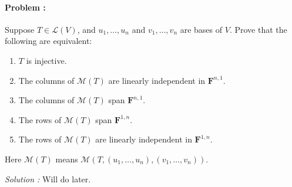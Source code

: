 \paragraph{Problem :}
Suppose \(T \in \mathcal{L}(V)\), and \(u_{1}, \dots, u_{n}\) and \(v_{1}, \dots, v_{n}\) are bases of \(V\). Prove that the following are
equivalent:
\begin{enumerate}[label=(\alph*)]
\item \(T\) is injective.
\item The columns of \(\mathcal{M}(T)\) are linearly independent in \(\mathbf{F}^{n,1}\).
\item The columns of \(\mathcal{M}(T)\) span \(\mathbf{F}^{n,1}\).
\item The rows of \(\mathcal{M}(T)\) span \(\mathbf{F}^{1,n}\).
\item The rows of \(\mathcal{M}(T)\) are linearly independent in \(\mathbf{F}^{1,n}\).
\end{enumerate}

Here \(\mathcal{M}(T)\) means \(\mathcal{M}(T, (u_{1}, \dots, u_{n}), (v_{1}, \dots, v_{n}))\).

\vspace{4mm}
\textit{Solution :}
Will do later.

